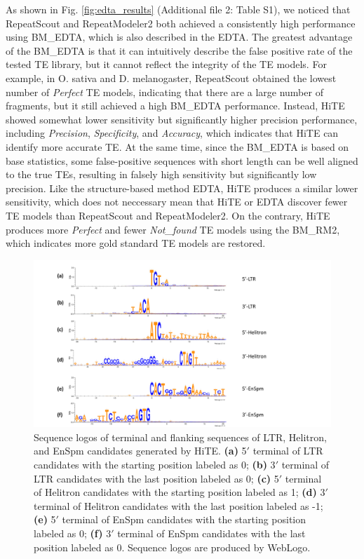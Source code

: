\documentclass{bmcart}
\begin{document}
As shown in Fig. \ref{fig:edta_results} (Additional file 2: Table S1), we noticed that RepeatScout and RepeatModeler2 both achieved a consistently high performance using BM\_EDTA, which is also described in the EDTA\cite{ou2019benchmarking}. The greatest advantage of the BM\_EDTA is that it can intuitively describe the false positive rate of the tested TE library, but it cannot reflect the integrity of the TE models. For example, in O. sativa and D. melanogaster, RepeatScout obtained the lowest number of \emph{Perfect} TE models, indicating that there are a large number of fragments, but it still achieved a high BM\_EDTA performance. Instead, HiTE showed somewhat lower sensitivity but significantly higher precision performance, including \emph{Precision}, \emph{Specificity}, and \emph{Accuracy}, which indicates that HiTE can identify more accurate TE.  At the same time, since the BM\_EDTA is based on base statistics, some false-positive sequences with short length can be well aligned to the true TEs, resulting in falsely high sensitivity but significantly low precision. Like the structure-based method EDTA, HiTE produces a similar lower sensitivity, which does not neccessary mean that HiTE or EDTA discover fewer TE models than RepeatScout and RepeatModeler2. On the contrary, HiTE produces more \emph{Perfect} and fewer \emph{Not\_found} TE models using the BM\_RM2, which indicates more gold standard TE models are restored.

\begin{figure}[h!]
	\centerline{\includegraphics[width=1.0\textwidth]{figures/SeqLogos.pdf}}
	\caption{Sequence logos of terminal and flanking sequences of LTR, Helitron, and EnSpm candidates generated by HiTE. \textbf{(a)} 5$'$ terminal of LTR candidates with the starting position labeled as 0; \textbf{(b)} 3$'$ terminal of LTR candidates with the last position labeled as 0; \textbf{(c)} 5$'$ terminal of Helitron candidates with the starting position labeled as 1; \textbf{(d)} 3$'$ terminal of Helitron candidates with the last position labeled as -1; \textbf{(e)} 5$'$ terminal of EnSpm candidates with the starting position labeled as 0; \textbf{(f)} 3$'$ terminal of EnSpm candidates with the last position labeled as 0. Sequence logos are produced by WebLogo\cite{crooks2004weblogo}.}
	\label{fig:seq_logos}
\end{figure}
\end{document}
